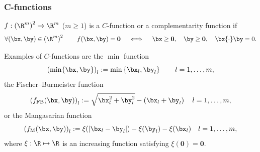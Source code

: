 \documentclass[aspectratio=169]{beamer}
\begin{document}
%
%
\begin{frame}
\frametitle{C-functions}
\begin{definition}
$f: \left(\R^m\right)^2  \rightarrow \R^m$ ($m \geq 1$) is a
$C$-function or a complementarity function if
\begin{equation*}
\forall(\bx,\by)\in \left(\R^m\right)^2
\qquad f(\bx,\by)=\mathbf{0} \quad \iff \quad
\bx \geq \mathbf{0}, \quad \by \geq \mathbf{0}, \quad \bx {\cdot} \by=0.
\end{equation*}
\end{definition}
Examples of $C$-functions are the $\min$ function
\begin{equation*}
\left(\min \{\bx, \by\}\right)_l \egaldef \min \left\{\bx_l, \by_l\right\} \qquad l = 1,\dots, m,
\end{equation*}
the Fischer--Burmeister function
\begin{equation*}
\left(f_{\mathrm{FB}}(\bx,\by)\right)_l \egaldef \sqrt{\bx_l^2+\by_l^2}-\left(\bx_l+\by_l\right) \quad  l = 1,\dots, m,
\end{equation*}
or the Mangasarian function
\begin{equation*}
\left(f_{\mathrm{M}}(\bx,\by)\right)_l \egaldef \xi (|\bx_l-\by_l|) - \xi(\by_l) - \xi(\bx_l)  \quad  l = 1,\dots, m, 
\end{equation*}
where $\xi: \R \mapsto \R$ is an increasing function satisfying $\xi(\bm 0)=\bm 0$. 
\end{frame}
%
\end{document}
